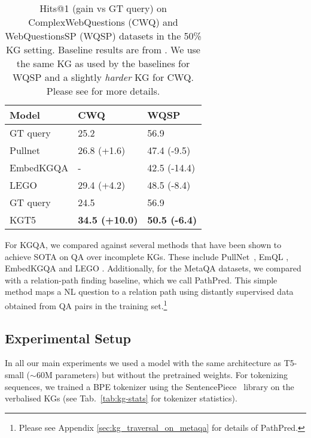 \documentclass[11pt]{article}
\renewcommand\:{\colon} \newcommand{\sset}[1]{\left\{\,#1\,\right\}} \newcommand{\ssets}[1]{\left\{#1\right\}} \newcommand{\ssetn}[1]{\{\,#1\,\}}
\newcommand{\method}{\textsc{KGT5}}
\begin{document}
\begin{table}[t!]
\centering
\resizebox{7cm}{!} {
\begin{tabular}{@{}lll@{}}
\toprule
\textbf{Model} & \textbf{CWQ}  & \textbf{WQSP} \\ \midrule
GT query       & 25.2   & 56.9          \\
Pullnet        & 26.8 \small (+1.6)         & 47.4 \hfill  \small (-9.5)        \\
EmbedKGQA      & -             & 42.5 \hfill \small (-14.4)        \\
LEGO           & 29.4 \small (+4.2)         & 48.5 \hfill \small (-8.4)        \\ \midrule
GT query       & 24.5          & 56.9           \\
\method{}           & \textbf{34.5 \small(+10.0)} & \textbf{50.5 \small(-6.4)} \\ \bottomrule
\end{tabular}
}
\caption{Hits@1 (gain vs GT query) on ComplexWebQuestions (CWQ) and WebQuestionsSP (WQSP) datasets in the 50\% KG setting. Baseline results are from \citet{ren2021lego}. We use the same KG as used by the baselines for WQSP and a slightly \textit{harder} KG for CWQ. Please see  for more details.}
\label{tab:cwq-wqsp-main-results}
\end{table} 
For KGQA, we compared against several methods that have been shown to achieve SOTA on QA over incomplete KGs. These include PullNet~\cite{sun2019pullnet}, EmQL \cite{sun2021faithful}, EmbedKGQA \cite{saxena2020improving} and LEGO \cite{ren2021lego}. Additionally, for the MetaQA datasets, we compared with a relation-path finding baseline, which we call PathPred. This simple method maps a NL question to a relation path using distantly supervised data obtained from QA pairs in the training set.\footnote{Please see Appendix \ref{sec:kg_traversal_on_metaqa} for details of PathPred.}


\subsection{Experimental Setup}
\label{sec:setup}

In all our main experiments we used a model with the same architecture as T5-small ($\sim$60M parameters) but without the pretrained weights. For tokenizing sequences, we trained a BPE tokenizer using the  SentencePiece~\cite{sentencepiece} library on the verbalised KGs (see Tab.~\ref{tab:kg-stats} for tokenizer statistics).
\end{document}
